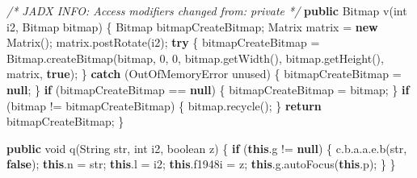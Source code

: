 \documentclass[
]{article}
\newenvironment{Shaded}{}{}
\newcommand{\BuiltInTok}[1]{\textcolor[rgb]{0.00,0.50,0.00}{#1}}
\newcommand{\CommentTok}[1]{\textcolor[rgb]{0.38,0.63,0.69}{\textit{#1}}}
\newcommand{\ControlFlowTok}[1]{\textcolor[rgb]{0.00,0.44,0.13}{\textbf{#1}}}
\newcommand{\DataTypeTok}[1]{\textcolor[rgb]{0.56,0.13,0.00}{#1}}
\newcommand{\DecValTok}[1]{\textcolor[rgb]{0.25,0.63,0.44}{#1}}
\newcommand{\FunctionTok}[1]{\textcolor[rgb]{0.02,0.16,0.49}{#1}}
\newcommand{\KeywordTok}[1]{\textcolor[rgb]{0.00,0.44,0.13}{\textbf{#1}}}
\newcommand{\NormalTok}[1]{#1}
\newcommand{\OperatorTok}[1]{\textcolor[rgb]{0.40,0.40,0.40}{#1}}
\begin{document}
\begin{Shaded}
\begin{Highlighting}[]
    \CommentTok{/* JADX INFO: Access modifiers changed from: private */}
    \KeywordTok{public}\NormalTok{ Bitmap }\FunctionTok{v}\OperatorTok{(}\DataTypeTok{int}\NormalTok{ i2}\OperatorTok{,}\NormalTok{ Bitmap bitmap}\OperatorTok{)} \OperatorTok{\{}
\NormalTok{        Bitmap bitmapCreateBitmap}\OperatorTok{;}
\NormalTok{        Matrix matrix }\OperatorTok{=} \KeywordTok{new} \FunctionTok{Matrix}\OperatorTok{();}
\NormalTok{        matrix}\OperatorTok{.}\FunctionTok{postRotate}\OperatorTok{(}\NormalTok{i2}\OperatorTok{);}
        \ControlFlowTok{try} \OperatorTok{\{}
\NormalTok{            bitmapCreateBitmap }\OperatorTok{=}\NormalTok{ Bitmap}\OperatorTok{.}\FunctionTok{createBitmap}\OperatorTok{(}\NormalTok{bitmap}\OperatorTok{,} \DecValTok{0}\OperatorTok{,} \DecValTok{0}\OperatorTok{,}\NormalTok{ bitmap}\OperatorTok{.}\FunctionTok{getWidth}\OperatorTok{(),}\NormalTok{ bitmap}\OperatorTok{.}\FunctionTok{getHeight}\OperatorTok{(),}\NormalTok{ matrix}\OperatorTok{,} \KeywordTok{true}\OperatorTok{);}
        \OperatorTok{\}} \ControlFlowTok{catch} \OperatorTok{(}\BuiltInTok{OutOfMemoryError}\NormalTok{ unused}\OperatorTok{)} \OperatorTok{\{}
\NormalTok{            bitmapCreateBitmap }\OperatorTok{=} \KeywordTok{null}\OperatorTok{;}
        \OperatorTok{\}}
        \ControlFlowTok{if} \OperatorTok{(}\NormalTok{bitmapCreateBitmap }\OperatorTok{==} \KeywordTok{null}\OperatorTok{)} \OperatorTok{\{}
\NormalTok{            bitmapCreateBitmap }\OperatorTok{=}\NormalTok{ bitmap}\OperatorTok{;}
        \OperatorTok{\}}
        \ControlFlowTok{if} \OperatorTok{(}\NormalTok{bitmap }\OperatorTok{!=}\NormalTok{ bitmapCreateBitmap}\OperatorTok{)} \OperatorTok{\{}
\NormalTok{            bitmap}\OperatorTok{.}\FunctionTok{recycle}\OperatorTok{();}
        \OperatorTok{\}}
        \ControlFlowTok{return}\NormalTok{ bitmapCreateBitmap}\OperatorTok{;}
    \OperatorTok{\}}

    \KeywordTok{public} \DataTypeTok{void} \FunctionTok{q}\OperatorTok{(}\BuiltInTok{String}\NormalTok{ str}\OperatorTok{,} \DataTypeTok{int}\NormalTok{ i2}\OperatorTok{,} \DataTypeTok{boolean}\NormalTok{ z}\OperatorTok{)} \OperatorTok{\{}
        \ControlFlowTok{if} \OperatorTok{(}\KeywordTok{this}\OperatorTok{.}\FunctionTok{g} \OperatorTok{!=} \KeywordTok{null}\OperatorTok{)} \OperatorTok{\{}
\NormalTok{            c}\OperatorTok{.}\FunctionTok{b}\OperatorTok{.}\FunctionTok{a}\OperatorTok{.}\FunctionTok{a}\OperatorTok{.}\FunctionTok{e}\OperatorTok{.}\FunctionTok{b}\OperatorTok{(}\NormalTok{str}\OperatorTok{,} \KeywordTok{false}\OperatorTok{);}
            \KeywordTok{this}\OperatorTok{.}\FunctionTok{n} \OperatorTok{=}\NormalTok{ str}\OperatorTok{;}
            \KeywordTok{this}\OperatorTok{.}\FunctionTok{l} \OperatorTok{=}\NormalTok{ i2}\OperatorTok{;}
            \KeywordTok{this}\OperatorTok{.}\FunctionTok{f1948i} \OperatorTok{=}\NormalTok{ z}\OperatorTok{;}
            \KeywordTok{this}\OperatorTok{.}\FunctionTok{g}\OperatorTok{.}\FunctionTok{autoFocus}\OperatorTok{(}\KeywordTok{this}\OperatorTok{.}\FunctionTok{p}\OperatorTok{);}
        \OperatorTok{\}}
    \OperatorTok{\}}


\end{Highlighting}
\end{Shaded}
\end{document}

